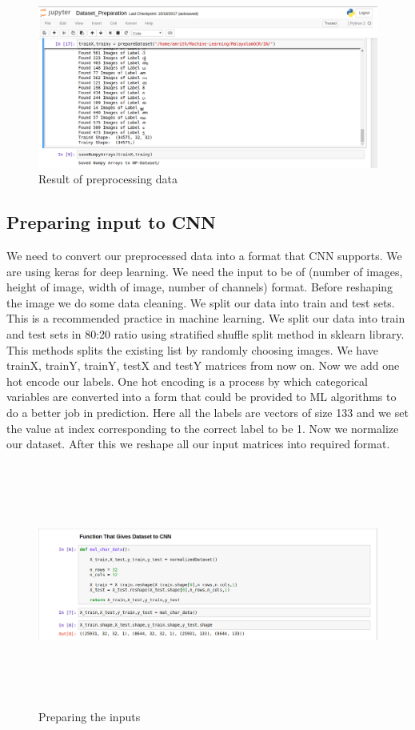 \documentclass[12pt]{report}
\begin{document}
\begin{figure}[h]
    \centering
    \includegraphics[width=\textwidth]{fig2.png}
    \caption{Result of preprocessing data}
\end{figure}

\subsection*{Preparing input to CNN}
We need to convert our preprocessed data into a format that CNN supports. We are using keras for deep learning. We need the input to be of (number of images, height of image, width of image, number of channels) format. Before reshaping the image we do some data cleaning. We split our data into train and test sets. This is a recommended practice in machine learning. We split our data into train and test sets in 80:20 ratio using stratified shuffle split method in sklearn library. This methods splits the existing list by randomly choosing images. We have trainX, trainY, trainY, testX and testY matrices from now on. Now we add one hot encode our labels. One hot encoding is a process by which categorical variables are converted into a form that could be provided to ML algorithms to do a better job in prediction. Here all the labels are vectors of size 133 and we set the value at index corresponding to the correct label to be 1. Now we normalize our dataset. After this we reshape all our input matrices into required format. 
 

\begin{figure}[h]
    \centering
    \includegraphics[width=\textwidth,height=8cm]{fig3.png}
    \caption{Preparing the inputs}
\end{figure}
\end{document}
